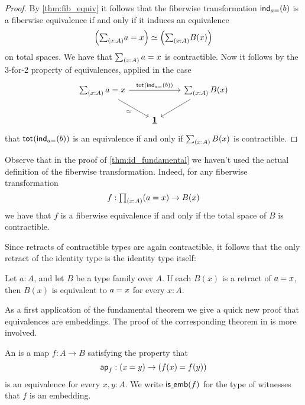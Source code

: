 \begin{proof}
By \autoref{thm:fib_equiv} it follows that the fiberwise transformation $\mathsf{ind}_{a{=}}(b)$ is a fiberwise equivalence if and only if it induces an equivalence
\begin{equation*}
\eqv{\Big(\sm{x:A}a=x\Big)}{\Big(\sm{x:A}B(x)\Big)}
\end{equation*}
on total spaces. We have that $\sm{x:A}a=x$ is contractible. Now it follows by the 3-for-2 property of equivalences, applied in the case
\begin{equation*}
\begin{tikzcd}
\sm{x:A}a=x \arrow[rr,"\total{\ind{a{=}}(b)}"] \arrow[dr,swap,"\eqvsym"] & & \sm{x:A}B(x) \arrow[dl] \\
& \unit
\end{tikzcd}
\end{equation*}
that $\mathsf{tot}_{}(\mathsf{ind}_{a{=}}(b))$ is an equivalence if and only if $\sm{x:A}B(x)$ is contractible.
\end{proof}

Observe that in the proof of \cref{thm:id_fundamental} we haven't used the actual definition of the fiberwise transformation. Indeed, for any fiberwise transformation
\begin{equation*}
f:\prd{x:A}(a=x)\to B(x)
\end{equation*}
we have that $f$ is a fiberwise equivalence if and only if the total space of $B$ is contractible.

Since retracts of contractible types are again contractible, it follows that the only retract of the identity type is the identity type itself:

\begin{cor}
Let $a:A$, and let $B$ be a type family over $A$. If each $B(x)$ is a retract of $\id{a}{x}$, then $B(x)$ is equivalent to $\id{a}{x}$ for every $x:A$.
\end{cor}

As a first application of the fundamental theorem we give a quick new proof that equivalences are embeddings. The proof of the corresponding theorem in \cite{hottbook} is more involved.

\begin{defn}
An  is a map $f:A\to B$ satisfying the property that
\begin{equation*}
\apfunc{f}:(\id{x}{y})\to(\id{f(x)}{f(y)})
\end{equation*}
is an equivalence for every $x,y:A$. We write $\mathsf{is\underline{\ }{}emb}(f)$ for the type of witnesses that $f$ is an embedding.
\end{defn}

